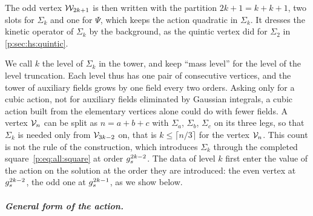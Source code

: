 The odd vertex $\mathcal{W}_{2 k + 1}$ is then written with the partition $2 k + 1 = k + k + 1$, two slots for $\Sigma_k$ and one for $\Psi$, which keeps the action quadratic in $\Sigma_k$.
It dresses the kinetic operator of $\Sigma_k$ by the background, as the quintic vertex did for $\Sigma_2$ in \cref{p:sec:hs:quintic}.

We call $k$ the level of $\Sigma_k$ in the tower, and keep ``mass level'' for the level of the level truncation.
Each level thus has one pair of consecutive vertices, and the tower of auxiliary fields grows by one field every two orders.
Asking only for a cubic action, not for auxiliary fields eliminated by Gaussian integrals, a cubic action built from the elementary vertices alone could do with fewer fields.
A vertex $\mathcal{V}_{n}$ can be split as $n = a + b + c$ with $\Sigma_a$, $\Sigma_b$, $\Sigma_c$ on its three legs, so that $\Sigma_k$ is needed only from $\mathcal{V}_{3 k - 2}$ on, that is $k \le \lceil n / 3 \rceil$ for the vertex $\mathcal{V}_{n}$.
This count is not the rule of the construction, which introduces $\Sigma_k$ through the completed square~\eqref{p:eq:all:square} at order $g_s^{2 k - 2}$.
The data of level $k$ first enter the value of the action on the solution at the order they are introduced: the even vertex at $g_s^{2 k - 2}$, the odd one at $g_s^{2 k - 1}$, as we show below.

\subparagraph{General form of the action.}

